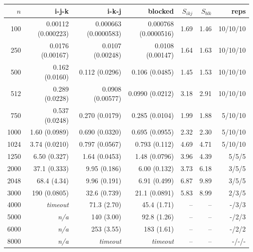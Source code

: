 \begin{tabular}{rrrrrrr}
\toprule
$n$ & i-j-k & i-k-j & blocked & $S_{ikj}$ & $S_{blk}$ & reps \\
\midrule
100 & 0.00112 (0.000223) & 0.000663 (0.0000583) & 0.000768 (0.0000516) & 1.69 & 1.46 & 10/10/10 \\
250 & 0.0176 (0.00167) & 0.0107 (0.00248) & 0.0108 (0.00147) & 1.64 & 1.63 & 10/10/10 \\
500 & 0.162 (0.0160) & 0.112 (0.0296) & 0.106 (0.0485) & 1.45 & 1.53 & 10/10/10 \\
512 & 0.289 (0.0228) & 0.0908 (0.00577) & 0.0990 (0.0212) & 3.18 & 2.91 & 10/10/10 \\
750 & 0.537 (0.0248) & 0.270 (0.0179) & 0.285 (0.0104) & 1.99 & 1.88 & 5/10/10 \\
1000 & 1.60 (0.0989) & 0.690 (0.0320) & 0.695 (0.0955) & 2.32 & 2.30 & 5/10/10 \\
1024 & 3.74 (0.0210) & 0.797 (0.0567) & 0.793 (0.112) & 4.69 & 4.71 & 5/10/10 \\
1250 & 6.50 (0.327) & 1.64 (0.0453) & 1.48 (0.0796) & 3.96 & 4.39 & 5/5/5 \\
2000 & 37.1 (0.333) & 9.95 (0.186) & 6.00 (0.132) & 3.73 & 6.18 & 3/5/5 \\
2048 & 68.4 (4.34) & 9.96 (0.191) & 6.91 (0.499) & 6.87 & 9.89 & 3/5/5 \\
3000 & 190 (0.0805) & 32.6 (0.739) & 21.1 (0.0891) & 5.83 & 8.99 & 2/3/5 \\
4000 & \emph{timeout} & 71.3 (2.70) & 45.4 (1.71) & -- & -- & -/3/3 \\
5000 & \emph{n/a} & 140 (3.00) & 92.8 (1.26) & -- & -- & -/2/3 \\
6000 & \emph{n/a} & 253 (3.55) & 183 (1.61) & -- & -- & -/2/2 \\
8000 & \emph{n/a} & \emph{timeout} & \emph{timeout} & -- & -- & -/-/- \\
\bottomrule
\end{tabular}
